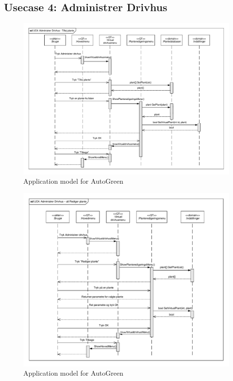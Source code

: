 \clearpage

\subsection{Usecase 4: Administrer Drivhus}

\begin{figure}[!h]
\centering 
\includegraphics[width={\textwidth-1cm}, trim=0 0 0 0, clip=true] {../fig/SD_autoGreen_UC_4_Administrerdrivhus.pdf}
\caption{Application model for AutoGreen}
\label{fig:SD_UC4}
\end{figure}

\clearpage

\begin{figure}[!h]
\centering 
\includegraphics[width={\textwidth-1cm}, trim=0 0 0 0, clip=true] {../fig/SD_autoGreen_UC_4_Administrerdrivhus_alt_redigerplante.pdf}
\caption{Application model for AutoGreen}
\label{fig:SD_UC1_alt1}
\end{figure}

